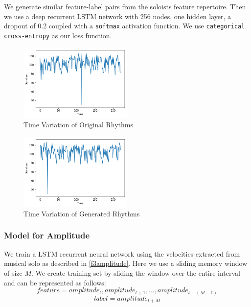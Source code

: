 \documentclass[conference]{IEEEtran}
\begin{document}
We generate similar feature-label pairs from the soloists feature repertoire. Then we use a deep recurrent LSTM network with 256 nodes, one hidden layer, a dropout of 0.2 coupled with a \texttt{softmax} activation function. We use \texttt{categorical cross-entropy} as our loss function.\\

\begin{figure}[h]
\includegraphics[width=0.5\textwidth]{IEEEtran/amp_o.png}
\caption{Time Variation of Original Rhythms}
\label{fig:figure3}
\end{figure}

\begin{figure}[h]
\includegraphics[width=0.5\textwidth]{IEEEtran/amp_g.png}
\caption{Time Variation of Generated Rhythms}
\label{fig:figure4}
\end{figure}

\subsubsection{Model for Amplitude}
We train a LSTM recurrent neural network using the velocities extracted from musical solo as described in \ref{f3amplitude}. Here we use a sliding memory window of size $M$. We create training set by sliding the window over the entire interval and can be represented as follows:
$$feature = {amplitude_{t},amplitude_{t+1},...,amplitude_{t+(M-1)}}$$
$$label = {amplitude_{t+M}}$$
\end{document}
